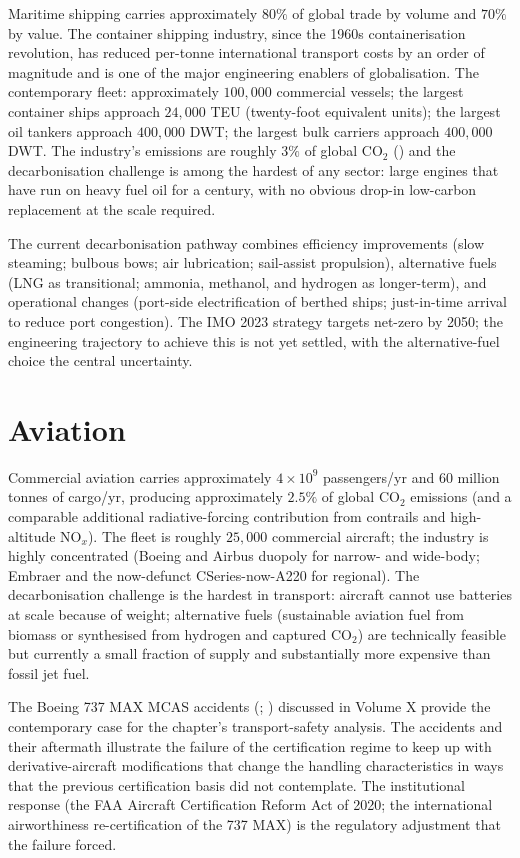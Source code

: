 Maritime shipping carries approximately $80\%$ of global trade by volume and $70\%$ by value. The container shipping industry, since the 1960s containerisation revolution, has reduced per-tonne international transport costs by an order of magnitude and is one of the major engineering enablers of globalisation. The contemporary fleet: approximately $100{,}000$ commercial vessels; the largest container ships approach $24{,}000$ TEU (twenty-foot equivalent units); the largest oil tankers approach $400{,}000$ DWT; the largest bulk carriers approach $400{,}000$ DWT. The industry's emissions are roughly $3\%$ of global CO$_2$ (\cite{std:imo-ghg-2020}) and the decarbonisation challenge is among the hardest of any sector: large engines that have run on heavy fuel oil for a century, with no obvious drop-in low-carbon replacement at the scale required.

The current decarbonisation pathway combines efficiency improvements (slow steaming; bulbous bows; air lubrication; sail-assist propulsion), alternative fuels (LNG as transitional; ammonia, methanol, and hydrogen as longer-term), and operational changes (port-side electrification of berthed ships; just-in-time arrival to reduce port congestion). The IMO 2023 strategy targets net-zero by 2050; the engineering trajectory to achieve this is not yet settled, with the alternative-fuel choice the central uncertainty.

\section{Aviation}

Commercial aviation carries approximately $4 \times 10^9$ passengers/yr and $60$ million tonnes of cargo/yr, producing approximately $2.5\%$ of global CO$_2$ emissions (and a comparable additional radiative-forcing contribution from contrails and high-altitude NO$_x$). The fleet is roughly $25{,}000$ commercial aircraft; the industry is highly concentrated (Boeing and Airbus duopoly for narrow- and wide-body; Embraer and the now-defunct CSeries-now-A220 for regional). The decarbonisation challenge is the hardest in transport: aircraft cannot use batteries at scale because of weight; alternative fuels (sustainable aviation fuel from biomass or synthesised from hydrogen and captured CO$_2$) are technically feasible but currently a small fraction of supply and substantially more expensive than fossil jet fuel.

The Boeing 737 MAX MCAS accidents (\cite{acc:knkt-lion-air-610-2019}; \cite{acc:house-737max-2020}) discussed in Volume X provide the contemporary case for the chapter's transport-safety analysis. The accidents and their aftermath illustrate the failure of the certification regime to keep up with derivative-aircraft modifications that change the handling characteristics in ways that the previous certification basis did not contemplate. The institutional response (the FAA Aircraft Certification Reform Act of 2020; the international airworthiness re-certification of the 737 MAX) is the regulatory adjustment that the failure forced.

